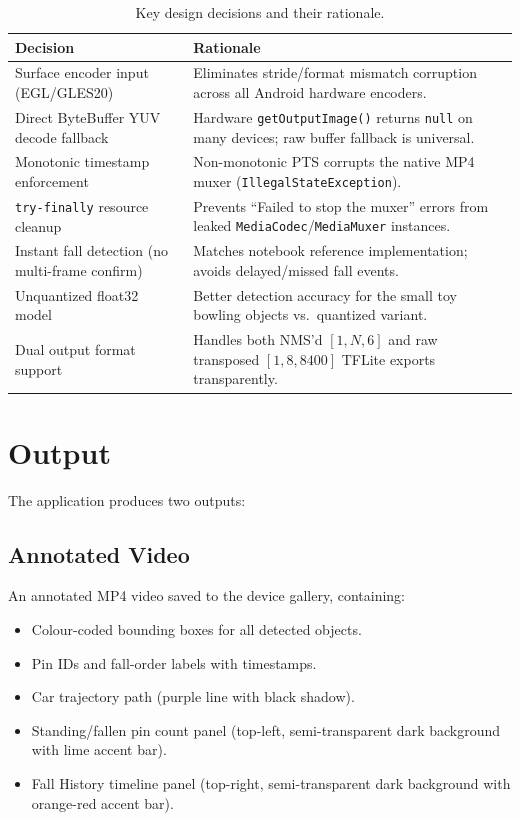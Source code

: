 \documentclass{zc-ust-hw}
\begin{document}
\begin{table}[H]
\centering
\begin{tabularx}{\textwidth}{lX}
\toprule
\textbf{Decision} & \textbf{Rationale} \\
\midrule
Surface encoder input (EGL/GLES20) & Eliminates stride/format mismatch corruption across all Android hardware encoders. \\
Direct ByteBuffer YUV decode fallback & Hardware \texttt{getOutputImage()} returns \texttt{null} on many devices; raw buffer fallback is universal. \\
Monotonic timestamp enforcement & Non-monotonic PTS corrupts the native MP4 muxer (\texttt{IllegalStateException}). \\
\texttt{try-finally} resource cleanup & Prevents ``Failed to stop the muxer'' errors from leaked \texttt{MediaCodec}/\texttt{MediaMuxer} instances. \\
Instant fall detection (no multi-frame confirm) & Matches notebook reference implementation; avoids delayed/missed fall events. \\
Unquantized float32 model & Better detection accuracy for the small toy bowling objects vs.\ quantized variant. \\
Dual output format support & Handles both NMS'd $[1, N, 6]$ and raw transposed $[1, 8, 8400]$ TFLite exports transparently. \\
\bottomrule
\end{tabularx}
\caption{Key design decisions and their rationale.}
\end{table}

\section{Output}

The application produces two outputs:

\subsection{Annotated Video}

An annotated MP4 video saved to the device gallery, containing:
\begin{itemize}
    \item Colour-coded bounding boxes for all detected objects.
    \item Pin IDs and fall-order labels with timestamps.
    \item Car trajectory path (purple line with black shadow).
    \item Standing/fallen pin count panel (top-left, semi-transparent dark background with lime accent bar).
    \item Fall History timeline panel (top-right, semi-transparent dark background with orange-red accent bar).
\end{itemize}
\end{document}
